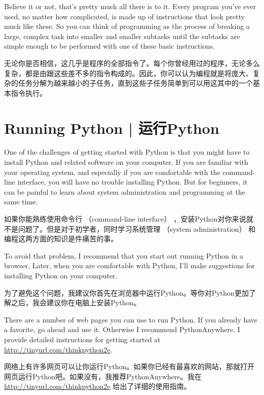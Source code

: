 Believe it or not, that's pretty much all there is to it.  Every
program you've ever used, no matter how complicated, is made up of
instructions that look pretty much like these.  So you can think of
programming as the process of breaking a large, complex task
into smaller and smaller subtasks until the subtasks are
simple enough to be performed with one of these basic instructions.

无论你是否相信，这几乎是程序的全部指令了。每个你曾经用过的程序，无论多么复杂，都是由跟这些差不多的指令构成的。因此，你可以认为编程就是将庞大、复杂的任务分解为越来越小的子任务，直到这些子任务简单到可以用这其中的一个基本指令执行。

\section{Running Python  |  运行Python}

One of the challenges of getting started with Python is that you
might have to install Python and related software on your computer.
If you are familiar with your operating system, and especially
if you are comfortable with the command-line interface, you will
have no trouble installing Python.  But for beginners, it can be
painful to learn about system administration and programming at the
same time.

如果你能熟练使用命令行  （command-line interface）  ，安装Python对你来说就不是问题了。但是对于初学者，同时学习系统管理  （system administration）  和编程这两方面的知识是件痛苦的事。
  

To avoid that problem, I recommend that you start out running Python
in a browser.  Later, when you are comfortable with Python, I'll
make suggestions for installing Python on your computer.

为了避免这个问题，我建议你首先在浏览器中运行Python。等你对Python更加了解之后，我会建议你在电脑上安装Python。

There are a number of web pages you can use to run Python.  If you
already have a favorite, go ahead and use it.  Otherwise I recommend
PythonAnywhere.  I provide detailed instructions for getting started
at \url{http://tinyurl.com/thinkpython2e}.

网络上有许多网页可以让你运行Python。如果你已经有最喜欢的网站，那就打开网页运行Python吧。如果没有，我推荐PythonAnywhere。我在 \href{http://tinyurl.com/thinkpython2e}{http://tinyurl.com/thinkpython2e} 给出了详细的使用指南。

